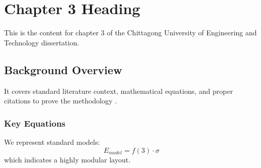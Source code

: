 \chapter{Chapter 3 Heading}
\label{ch:chapter3}
This is the content for chapter 3 of the Chittagong University of Engineering and Technology dissertation.

\section{Background Overview}
It covers standard literature context, mathematical equations, and proper citations to prove the methodology \cite{texbook}.

\subsection{Key Equations}
We represent standard models:
\begin{equation}
    E_{model} = f(3) \cdot \sigma
\end{equation}
which indicates a highly modular layout.
